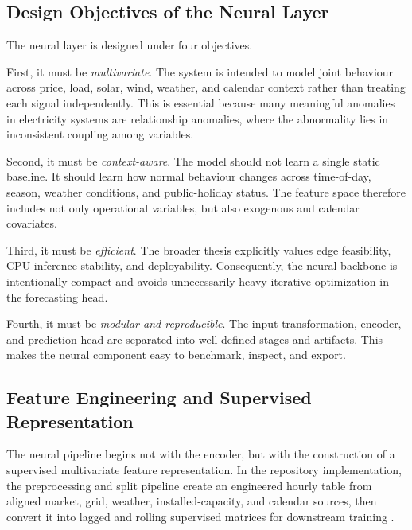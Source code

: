 \subsection{Design Objectives of the Neural Layer}

The neural layer is designed under four objectives.

First, it must be \emph{multivariate}. The system is intended to model joint behaviour across price, load, solar, wind, weather, and calendar context rather than treating each signal independently. This is essential because many meaningful anomalies in electricity systems are relationship anomalies, where the abnormality lies in inconsistent coupling among variables.

Second, it must be \emph{context-aware}. The model should not learn a single static baseline. It should learn how normal behaviour changes across time-of-day, season, weather conditions, and public-holiday status. The feature space therefore includes not only operational variables, but also exogenous and calendar covariates.

Third, it must be \emph{efficient}. The broader thesis explicitly values edge feasibility, CPU inference stability, and deployability. Consequently, the neural backbone is intentionally compact and avoids unnecessarily heavy iterative optimization in the forecasting head.

Fourth, it must be \emph{modular and reproducible}. The input transformation, encoder, and prediction head are separated into well-defined stages and artifacts. This makes the neural component easy to benchmark, inspect, and export.

\subsection{Feature Engineering and Supervised Representation}

The neural pipeline begins not with the encoder, but with the construction of a supervised multivariate feature representation. In the repository implementation, the preprocessing and split pipeline create an engineered hourly table from aligned market, grid, weather, installed-capacity, and calendar sources, then convert it into lagged and rolling supervised matrices for downstream training \cite{repo_thesis_grid_anomaly}.

